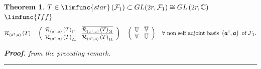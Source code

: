 \documentclass[aps,preprint]{revtex4}
\newtheorem{theorem}{Theorem}
\newenvironment{proof}[1][Proof]{\noindent\textbf{#1.} }{\ \rule{0.5em}{0.5em}}
\begin{document}
\begin{theorem}
$T\in \overset{}{\limfunc{star}\left( \mathcal{F}_{1}\right) \subset GL(2r,%
\mathcal{F}_{1}\mathbb{)}\cong GL\left( 2r,\mathbb{C}\right) }$ $\limfunc{Iff%
}$ 
\begin{equation}
\mathcal{R}_{\left( a^{\dagger },a\right) }\left( T\right) =\left( 
\begin{array}{cc}
\mathcal{R}_{\left( a^{\dagger },a\right) }\left( T\right) _{11} & \overline{%
\mathcal{R}_{\left( a^{\dagger },a\right) }\left( T\right) _{21}} \\ 
\mathcal{R}_{\left( a^{\dagger },a\right) }\left( T\right) _{21} & \overline{%
\mathcal{R}_{\left( a^{\dagger },a\right) }\left( T\right) _{11}}%
\end{array}%
\right) =\left( 
\begin{array}{cc}
\mathbb{U} & \overline{\mathbb{V}} \\ 
\mathbb{V} & \overline{\mathbb{U}}%
\end{array}%
\right) \quad \forall \text{ non self adjoint basis }\left( \boldsymbol{a}%
^{\dagger },\boldsymbol{a}\right) \text{ of }\mathcal{F}_{1}.
\end{equation}

\begin{proof}
from the preceding remark.
\end{proof}
\end{theorem}
\end{document}
